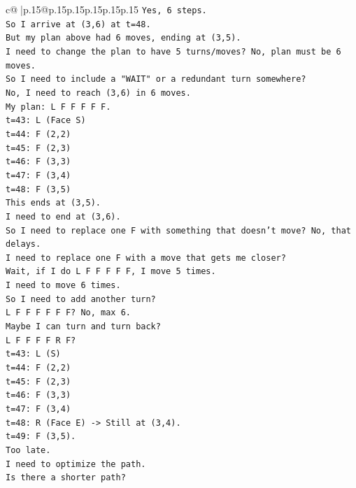 \documentclass{article}
\begin{document}
{\begin{supertabular}{c@{$\;$}|p{.15\linewidth}@{}p{.15\linewidth}p{.15\linewidth}p{.15\linewidth}p{.15\linewidth}p{.15\linewidth}}
{{{\texttt{Yes, 6 steps.} \\
\texttt{So I arrive at (3,6) at t=48.} \\
\texttt{But my plan above had 6 moves, ending at (3,5).} \\
\texttt{I need to change the plan to have 5 turns/moves? No, plan must be 6 moves.} \\
\texttt{So I need to include a "WAIT" or a redundant turn somewhere?} \\
\texttt{No, I need to reach (3,6) in 6 moves.} \\
\texttt{My plan: L F F F F F.} \\
\texttt{t=43: L (Face S)} \\
\texttt{t=44: F (2,2)} \\
\texttt{t=45: F (2,3)} \\
\texttt{t=46: F (3,3)} \\
\texttt{t=47: F (3,4)} \\
\texttt{t=48: F (3,5)} \\
\texttt{This ends at (3,5).} \\
\texttt{I need to end at (3,6).} \\
\texttt{So I need to replace one F with something that doesn't move? No, that delays.} \\
\texttt{I need to replace one F with a move that gets me closer?} \\
\texttt{Wait, if I do L F F F F F, I move 5 times.} \\
\texttt{I need to move 6 times.} \\
\texttt{So I need to add another turn?} \\
\texttt{L F F F F F F? No, max 6.} \\
\texttt{Maybe I can turn and turn back?} \\
\texttt{L F F F F R F?} \\
\texttt{t=43: L (S)} \\
\texttt{t=44: F (2,2)} \\
\texttt{t=45: F (2,3)} \\
\texttt{t=46: F (3,3)} \\
\texttt{t=47: F (3,4)} \\
\texttt{t=48: R (Face E) {-}> Still at (3,4).} \\
\texttt{t=49: F (3,5).} \\
\texttt{Too late.} \\
\texttt{I need to optimize the path.} \\
\texttt{Is there a shorter path?} \\
}}}
\end{supertabular}}
\end{document}
